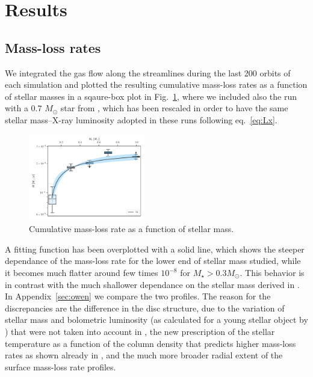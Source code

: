 \documentclass{aa}
\begin{document}
\section{Results}\label{sec:results}

\subsection{Mass-loss rates}\label{sec:mdot}
We integrated the gas flow along the streamlines during the last 200 orbits of each simulation and plotted the resulting cumulative mass-loss rates as a function of stellar masses in a sqaure-box plot in Fig.~\ref{fig:Mdot}, where we included also the run with a $0.7$ $M_\odot$ star from , which has been rescaled in order to have the same stellar mass--X-ray luminosity adopted in these runs following eq.~\ref{eq:Lx}.
\begin{figure}
  \centering
  \includegraphics[width=0.45\textwidth]{mdot}
  \caption{Cumulative mass-loss rate as a function of stellar mass. \label{fig:Mdot}}
\end{figure}
A fitting function has been overplotted with a solid line, which shows the steeper dependance of the mass-loss rate for the lower end of stellar mass studied, while it becomes much flatter around few times $10^{-8}$ for $M_\star > 0.3 M_\odot$.
This behavior is in contrast with the much shallower dependance on the stellar mass derived in . In Appendix~\ref{sec:owen} we compare the two profiles.
The reason for the discrepancies are the difference in the disc structure, due to the variation of stellar mass and bolometric luminosity (as calculated for a young stellar object by ) that were not taken into account in , the new prescription of the stellar temperature as a function of the column density that predicts higher mass-loss rates as shown already in , and the much more broader radial extent of the surface mass-loss rate profiles.
\end{document}
